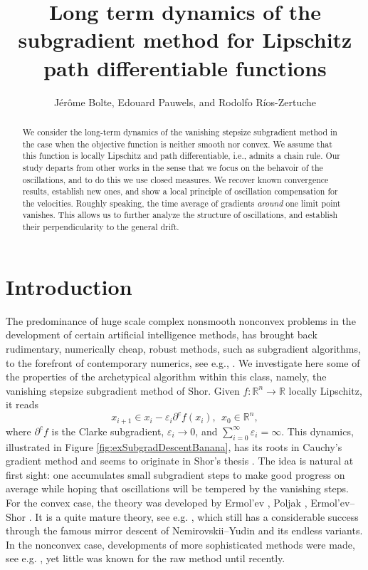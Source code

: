 \documentclass[11pt]{article}
\title{Long term dynamics of the subgradient method for Lipschitz path differentiable functions\\
%
%
}
\author{
 J\'er\^ome Bolte, Edouard Pauwels, and
 Rodolfo R\'ios-Zertuche
}
\theoremstyle{definition}
\theoremstyle{remark}
\newcommand{\R}{\mathbb{R}}
\begin{document}
\maketitle
\begin{abstract}
We consider the long-term dynamics of the vanishing stepsize subgradient method in the case when the objective function is neither smooth nor convex. We assume that this function is locally Lipschitz and path differentiable, i.e., admits a chain rule. Our study departs from other works in the sense that we focus on the behavoir of the oscillations, and to do this we use closed measures. We recover known convergence results, establish new ones, and show a local principle of oscillation compensation for the velocities. Roughly speaking, the time average of gradients {\em around} one limit point vanishes. 
This allows us to further analyze  the structure of oscillations, and establish their perpendicularity to the general drift.
%
\end{abstract}
\newpage
\tableofcontents
\newpage
\section{Introduction}
\label{sec:intro}



 The predominance of huge scale complex nonsmooth nonconvex problems in the development of certain artificial intelligence methods, has brought back rudimentary, numerically cheap, robust methods, such as subgradient algorithms, to the forefront of contemporary numerics, see e.g., \cite{higham2019deep,duchi2011adaptive,kingma2014adam,barakat2019convergence,bianchi2020convergence}. We investigate here some of the properties of the archetypical algorithm within this class, namely, the vanishing stepsize  subgradient method of Shor. Given $f:\R^n\to\R$ locally Lipschitz, it reads
 $$x_{i+1}\in x_i-\varepsilon_i\partial^c f(x_i), \:\: x_0\in \R^n,$$
 where $\partial^c f$ is the Clarke subgradient, $\varepsilon_i \to 0$, and 
 $\sum_{i=0}^\infty\varepsilon_i=\infty$. 
  This dynamics, illustrated in Figure \ref{fig:exSubgradDescentBanana}, has its roots in Cauchy's gradient method and seems to originate in Shor's thesis \cite{shorthesis}. The idea is natural at first sight: one accumulates small subgradient steps  to make good progress on average while  hoping that oscillations will be tempered by the vanishing steps.  For the convex case, the theory was developed by Ermol'ev \cite{ermolev66}, Poljak \cite{poljak67},  Ermol'ev--Shor \cite{ermol67}. It is a quite mature theory, see e.g. \cite{nemirovskii1979complexity,nesterov2013introductory}, which still has a considerable success through the famous mirror descent of Nemirovskii--Yudin \cite{nemirovskii1979complexity,beck2003mirror} and its endless variants. In the nonconvex case, developments of more sophisticated methods were made, see e.g. \cite{kiwiel2001,hare2010redistributed,noll2013bundle}, yet little  was known for the raw method until recently.
\end{document}
